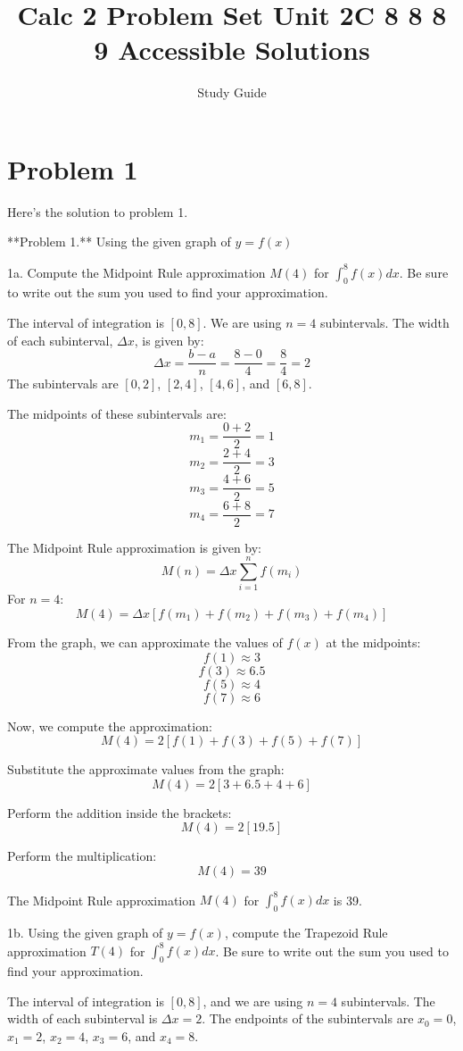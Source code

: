 \documentclass{article}
\begin{document}
\title{Calc 2 Problem Set Unit 2C 8 8 8 9 Accessible Solutions}
\author{Study Guide}\n\maketitle
\section*{Problem 1}
Here's the solution to problem 1.

**Problem 1.** Using the given graph of $y = f(x)$

1a. Compute the Midpoint Rule approximation $M(4)$ for $\int_{0}^{8} f(x)dx$. Be sure to write out the sum you used to find your approximation.

The interval of integration is $[0, 8]$. We are using $n=4$ subintervals.
The width of each subinterval, $\Delta x$, is given by:
$$ \Delta x = \frac{b-a}{n} = \frac{8-0}{4} = \frac{8}{4} = 2 $$
The subintervals are $[0, 2]$, $[2, 4]$, $[4, 6]$, and $[6, 8]$.

The midpoints of these subintervals are:
$$ m_1 = \frac{0+2}{2} = 1 $$
$$ m_2 = \frac{2+4}{2} = 3 $$
$$ m_3 = \frac{4+6}{2} = 5 $$
$$ m_4 = \frac{6+8}{2} = 7 $$

The Midpoint Rule approximation is given by:
$$ M(n) = \Delta x \sum_{i=1}^{n} f(m_i) $$
For $n=4$:
$$ M(4) = \Delta x [f(m_1) + f(m_2) + f(m_3) + f(m_4)] $$

From the graph, we can approximate the values of $f(x)$ at the midpoints:
$$ f(1) \approx 3 $$
$$ f(3) \approx 6.5 $$
$$ f(5) \approx 4 $$
$$ f(7) \approx 6 $$

Now, we compute the approximation:
$$ M(4) = 2 [f(1) + f(3) + f(5) + f(7)] $$

Substitute the approximate values from the graph:
$$ M(4) = 2 [3 + 6.5 + 4 + 6] $$

Perform the addition inside the brackets:
$$ M(4) = 2 [19.5] $$

Perform the multiplication:
$$ M(4) = 39 $$

The Midpoint Rule approximation $M(4)$ for $\int_{0}^{8} f(x)dx$ is 39.

1b. Using the given graph of $y = f(x)$, compute the Trapezoid Rule approximation $T(4)$ for $\int_{0}^{8} f(x)dx$. Be sure to write out the sum you used to find your approximation.

The interval of integration is $[0, 8]$, and we are using $n=4$ subintervals.
The width of each subinterval is $\Delta x = 2$.
The endpoints of the subintervals are $x_0=0$, $x_1=2$, $x_2=4$, $x_3=6$, and $x_4=8$.
\end{document}
